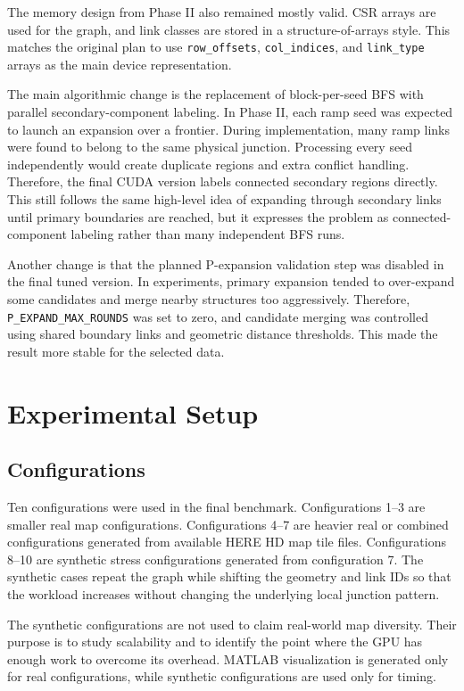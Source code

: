 \documentclass[conference]{IEEEtran}
\begin{document}
The memory design from Phase II also remained mostly valid. CSR arrays are used for the graph, and link classes are stored in a structure-of-arrays style. This matches the original plan to use \texttt{row\_offsets}, \texttt{col\_indices}, and \texttt{link\_type} arrays as the main device representation.

The main algorithmic change is the replacement of block-per-seed BFS with parallel secondary-component labeling. In Phase II, each ramp seed was expected to launch an expansion over a frontier. During implementation, many ramp links were found to belong to the same physical junction. Processing every seed independently would create duplicate regions and extra conflict handling. Therefore, the final CUDA version labels connected secondary regions directly. This still follows the same high-level idea of expanding through secondary links until primary boundaries are reached, but it expresses the problem as connected-component labeling rather than many independent BFS runs.

Another change is that the planned P-expansion validation step was disabled in the final tuned version. In experiments, primary expansion tended to over-expand some candidates and merge nearby structures too aggressively. Therefore, \texttt{P\_EXPAND\_MAX\_ROUNDS} was set to zero, and candidate merging was controlled using shared boundary links and geometric distance thresholds. This made the result more stable for the selected data.

\section{Experimental Setup}

\subsection{Configurations}

Ten configurations were used in the final benchmark. Configurations 1--3 are smaller real map configurations. Configurations 4--7 are heavier real or combined configurations generated from available HERE HD map tile files. Configurations 8--10 are synthetic stress configurations generated from configuration 7. The synthetic cases repeat the graph while shifting the geometry and link IDs so that the workload increases without changing the underlying local junction pattern.

The synthetic configurations are not used to claim real-world map diversity. Their purpose is to study scalability and to identify the point where the GPU has enough work to overcome its overhead. MATLAB visualization is generated only for real configurations, while synthetic configurations are used only for timing.
\end{document}
